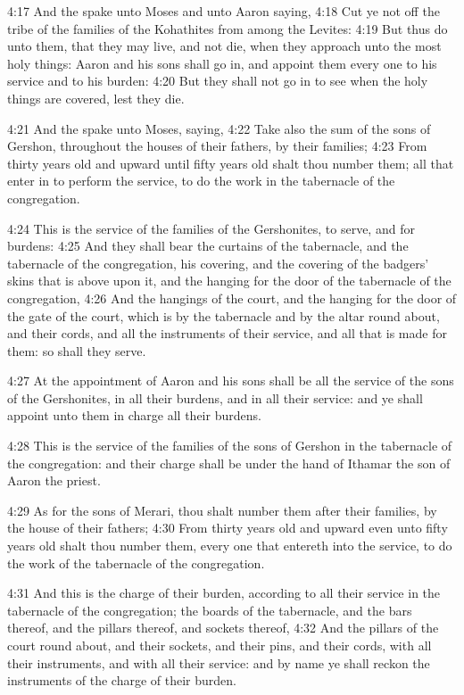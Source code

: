 4:17 And the \LORD spake unto Moses and unto Aaron saying, 4:18 Cut ye
not off the tribe of the families of the Kohathites from among the
Levites: 4:19 But thus do unto them, that they may live, and not die,
when they approach unto the most holy things: Aaron and his sons shall
go in, and appoint them every one to his service and to his burden:
4:20 But they shall not go in to see when the holy things are covered,
lest they die.

4:21 And the \LORD spake unto Moses, saying, 4:22 Take also the sum of
the sons of Gershon, throughout the houses of their fathers, by their
families; 4:23 From thirty years old and upward until fifty years old
shalt thou number them; all that enter in to perform the service, to
do the work in the tabernacle of the congregation.

4:24 This is the service of the families of the Gershonites, to serve,
and for burdens: 4:25 And they shall bear the curtains of the
tabernacle, and the tabernacle of the congregation, his covering, and
the covering of the badgers' skins that is above upon it, and the
hanging for the door of the tabernacle of the congregation, 4:26 And
the hangings of the court, and the hanging for the door of the gate of
the court, which is by the tabernacle and by the altar round about,
and their cords, and all the instruments of their service, and all
that is made for them: so shall they serve.

4:27 At the appointment of Aaron and his sons shall be all the service
of the sons of the Gershonites, in all their burdens, and in all their
service: and ye shall appoint unto them in charge all their burdens.

4:28 This is the service of the families of the sons of Gershon in the
tabernacle of the congregation: and their charge shall be under the
hand of Ithamar the son of Aaron the priest.

4:29 As for the sons of Merari, thou shalt number them after their
families, by the house of their fathers; 4:30 From thirty years old
and upward even unto fifty years old shalt thou number them, every one
that entereth into the service, to do the work of the tabernacle of
the congregation.

4:31 And this is the charge of their burden, according to all their
service in the tabernacle of the congregation; the boards of the
tabernacle, and the bars thereof, and the pillars thereof, and sockets
thereof, 4:32 And the pillars of the court round about, and their
sockets, and their pins, and their cords, with all their instruments,
and with all their service: and by name ye shall reckon the
instruments of the charge of their burden.

